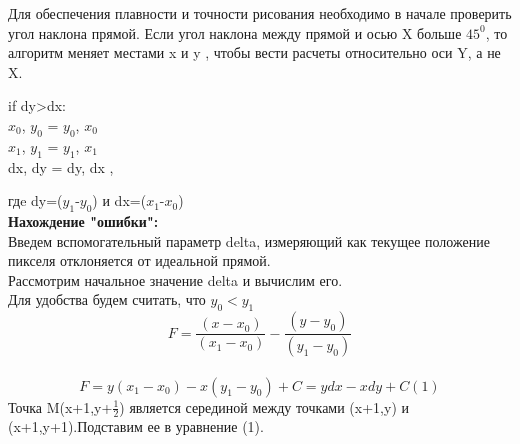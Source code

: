 \documentclass[a4paper, 12pt]{article}
\begin{document}
Для обеспечения плавности и точности рисования необходимо в начале проверить угол наклона прямой. Если угол наклона между прямой и осью X больше $45^0$, то алгоритм меняет местами x и y , чтобы вести расчеты относительно оси Y, а не X.
\begin{center}
                 
         if dy>dx:\\
        $x_0$, $y_0$ = $y_0$, $x_0$\\
        $x_1$, $y_1$ = $y_1$, $x_1$\\
        dx, dy = dy, dx ,
\end{center}
гдe dy=($y_1$-$y_0$) и dx=($x_1$-$x_0$)\\
\textbf{Нахождение "ошибки":} \\
Введем вспомогательный параметр delta, измеряющий как текущее положение пикселя отклоняется от идеальной прямой.\\
Рассмотрим начальное значение delta и вычислим его.\\
Для удобства будем считать, что $y_0<y_1$\\
\[F=\frac{(x-x_0)}{(x_1-x_0)}-\frac{(y-y_0)}{(y_1-y_0)} \]
\\
\[F=y(x_1-x_0)-x(y_1-y_0)+C=ydx-xdy+C (1)\]
\newpage
Точка M(x+1,y+$\frac{1}{2}$) является серединой между точками (x+1,y) и (x+1,y+1).Подставим ее в уравнение (1).\\
\end{document}
